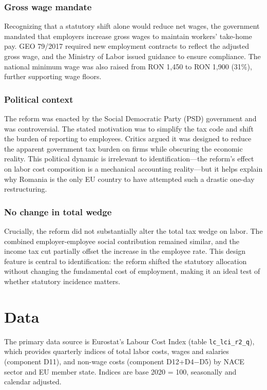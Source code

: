 \documentclass[12pt]{article}
\begin{document}
\subsubsection*{Gross wage mandate} Recognizing that a statutory shift alone would reduce net wages, the government mandated that employers increase gross wages to maintain workers' take-home pay. GEO 79/2017 required new employment contracts to reflect the adjusted gross wage, and the Ministry of Labor issued guidance to ensure compliance. The national minimum wage was also raised from RON 1,450 to RON 1,900 (31\%), further supporting wage floors.

\subsubsection*{Political context} The reform was enacted by the Social Democratic Party (PSD) government and was controversial. The stated motivation was to simplify the tax code and shift the burden of reporting to employees. Critics argued it was designed to reduce the apparent government tax burden on firms while obscuring the economic reality. This political dynamic is irrelevant to identification---the reform's effect on labor cost composition is a mechanical accounting reality---but it helps explain why Romania is the only EU country to have attempted such a drastic one-day restructuring.

\subsubsection*{No change in total wedge} Crucially, the reform did not substantially alter the total tax wedge on labor. The combined employer-employee social contribution remained similar, and the income tax cut partially offset the increase in the employee rate. This design feature is central to identification: the reform shifted the statutory allocation without changing the fundamental cost of employment, making it an ideal test of whether statutory incidence matters.


\section{Data}

The primary data source is Eurostat's Labour Cost Index (table \texttt{lc\_lci\_r2\_q}), which provides quarterly indices of total labor costs, wages and salaries (component D11), and non-wage costs (component D12+D4$-$D5) by NACE sector and EU member state. Indices are base 2020 = 100, seasonally and calendar adjusted.
\end{document}
